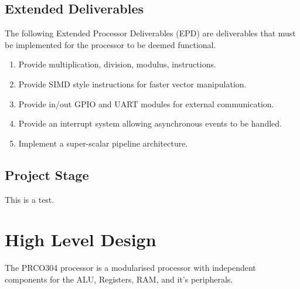 \documentclass[11pt,a4paper]{report}
\newcommand{\scname}{PRCO304}
\begin{document}
\subsection{Extended Deliverables}
The following Extended Processor Deliverables (EPD) are deliverables that must be implemented for the processor to be deemed functional.
\begin{enumerate}[label=\bfseries EPD\arabic*.]
\item{Provide multiplication, division, modulus, instructions.}
\item{Provide SIMD style instructions for faster vector manipulation.}
\item{Provide in/out GPIO and UART modules for external communication.}
\item{Provide an interrupt system allowing asynchronous events to be handled.}
\item{Implement a super-scalar pipeline architecture.}
\end{enumerate}

\subsection{Project Stage }
This is a test.

\newpage
\section{High Level Design}
The \scname{} processor is a modularised processor with independent components for the ALU, Registers, RAM, and it's peripherals. 

\end{document}
